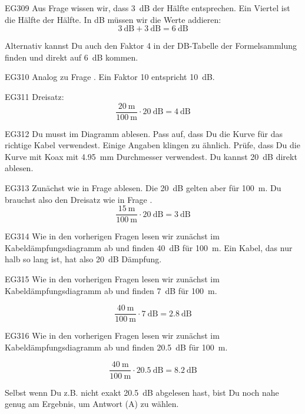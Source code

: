 \begin{sol}{EG309}
Aus Frage  wissen wir, dass \SI{3}{\dB} der Hälfte entsprechen.
Ein Viertel ist die Hälfte der Hälfte. In dB müssen wir die Werte addieren:
$$ \SI{3}{\dB} + \SI{3}{\dB} = \SI{6}{\dB}$$

Alternativ kannst Du auch den Faktor 4 in der DB-Tabelle der Formelsammlung finden und direkt auf \SI{6}{\dB} kommen.
\end{sol}

\begin{sol}{EG310}
    Analog zu Frage . Ein Faktor 10 entspricht \SI{10}{\dB}.
\end{sol}

\begin{sol}{EG311}
    Dreisatz: $$ \frac{\SI{20}{\meter}}{\SI{100}{\meter}}  \cdot \SI{20}{\dB} =  \SI{4}{\dB}$$
\end{sol}


\begin{sol}{EG312}
 Du musst im Diagramm ablesen. Pass auf, dass Du die Kurve für das richtige Kabel verwendest. Einige Angaben klingen zu ähnlich. Prüfe, dass Du die  Kurve  mit Koax mit \SI{4,95}{\milli\meter} Durchmesser verwendest.
 Du kannst \SI{20}{\dB} direkt ablesen.
\end{sol}

\begin{sol}{EG313}
 Zunächst wie in Frage  ablesen. Die \SI{20}{\dB} gelten aber für \SI{100}{\meter}. Du brauchst also den Dreisatz wie in Frage  .
 $$ \frac{\SI{15}{\meter}}{\SI{100}{\meter}}  \cdot \SI{20}{\dB} =  \SI{3}{\dB} $$
\end{sol}

\begin{sol}{EG314}
Wie in den vorherigen Fragen lesen wir zunächst im Kabeldämpfungsdiagramm ab und finden \SI{40}{\dB} für \SI{100}{\meter}. Ein Kabel, das nur halb so lang ist, hat also  \SI{20}{\dB} Dämpfung.
\end{sol}


\begin{sol}{EG315}
Wie in den vorherigen Fragen lesen wir zunächst im Kabeldämpfungsdiagramm ab und finden \SI{7}{\dB} für \SI{100}{\meter}. 

 $$ \frac{\SI{40}{\meter}}{\SI{100}{\meter}}  \cdot \SI{7}{\dB} =  \SI{2,8}{\dB} $$

\end{sol}

\begin{sol}{EG316}
Wie in den vorherigen Fragen lesen wir zunächst im Kabeldämpfungsdiagramm ab und finden \SI{20,5}{\dB} für \SI{100}{\meter}. 

 $$ \frac{\SI{40}{\meter}}{\SI{100}{\meter}}  \cdot \SI{20,5}{\dB} =  \SI{8,2}{\dB} $$

 Selbst wenn Du z.B. nicht exakt \SI{20,5}{\dB} abgelesen hast, bist Du noch nahe genug am Ergebnis, um Antwort (A) zu wählen.

\end{sol}


